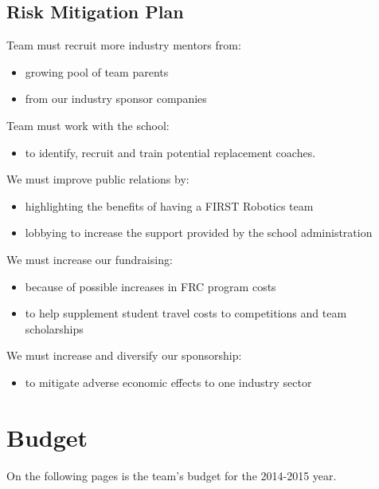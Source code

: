\subsection{Risk Mitigation Plan}
Team must recruit more industry mentors from:
\begin{itemize}
	\item growing pool of team parents
	\item from our industry sponsor companies
\end{itemize}

Team must work with the school:
\begin{itemize}
	\item to identify, recruit and train potential replacement coaches.
\end{itemize}

We must improve public relations by:
\begin{itemize}
	\item highlighting the benefits of having a FIRST Robotics team
	\item lobbying to increase the support provided by the school administration
\end{itemize}

We must increase our fundraising:
\begin{itemize}
	\item because of possible increases in FRC program costs
	\item to help supplement student travel costs to competitions and team scholarships
\end{itemize}

We must increase and diversify our sponsorship:
\begin{itemize}
	\item to mitigate adverse economic effects to one industry sector 
\end{itemize}

\newpage

\section{Budget}
On the following pages is the team's budget for the 2014-2015 year.

